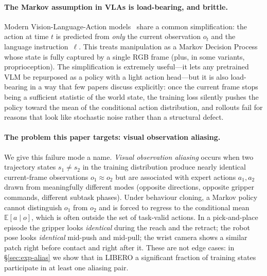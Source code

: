 \documentclass[11pt]{article}
\begin{document}
\paragraph{The Markov assumption in VLAs is load-bearing, and brittle.}
Modern Vision-Language-Action models~\cite{brohan2023rt2,kim2024openvla,black2024pi0}
share a common simplification: the action at time $t$ is predicted from
\emph{only} the current observation $o_t$ and the language instruction~$\ell$.
This treats manipulation as a Markov Decision Process whose state is fully captured
by a single RGB frame (plus, in some variants, proprioception). The simplification
is extremely useful---it lets any pretrained VLM be repurposed as a policy with a
light action head---but it is also load-bearing in a way that few papers discuss
explicitly: once the current frame stops being a sufficient statistic of the
world state, the training loss silently pushes the policy toward the mean of the
conditional action distribution, and rollouts fail for reasons that look like
stochastic noise rather than a structural defect.

\paragraph{The problem this paper targets: visual observation aliasing.}
We give this failure mode a name. \emph{Visual observation aliasing} occurs when
two trajectory states $s_1 \neq s_2$ in the training distribution produce nearly
identical current-frame observations $o_1 \approx o_2$ but are associated with
expert actions $a_1, a_2$ drawn from meaningfully different modes
(opposite directions, opposite gripper commands, different subtask phases). Under
behaviour cloning, a Markov policy cannot distinguish $o_1$ from $o_2$ and is
forced to regress to the conditional mean $\mathbb{E}[a \mid o]$, which is often
outside the set of task-valid actions. In a pick-and-place episode the gripper
looks \emph{identical} during the reach and the retract; the robot pose looks
\emph{identical} mid-push and mid-pull; the wrist camera shows a similar patch
right before contact and right after it. These are not edge cases: in
\S\ref{sec:exp-alias} we show that in LIBERO a significant fraction of training
states participate in at least one aliasing pair.
\end{document}
